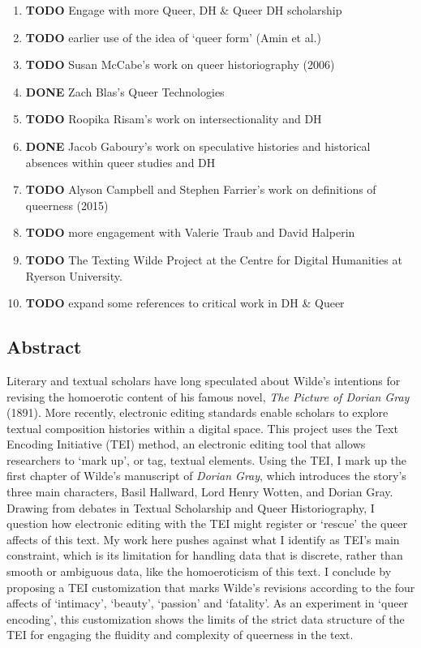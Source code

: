 \documentclass[11pt]{article}
\begin{document}
\begin{enumerate}
\item {\bfseries\sffamily TODO} Engage with more Queer, DH \& Queer DH scholarship
\label{sec:orga984432}
\item {\bfseries\sffamily TODO} earlier use of the idea of ‘queer form’ (Amin et al.)
\label{sec:org102b20c}
\item {\bfseries\sffamily TODO} Susan McCabe’s work on queer historiography (2006)
\label{sec:orgd49ad93}
\item {\bfseries\sffamily DONE} Zach Blas’s Queer Technologies
\label{sec:org9f8e8a2}
\item {\bfseries\sffamily TODO} Roopika Risam’s work on intersectionality and DH
\label{sec:org89c1e2b}
\item {\bfseries\sffamily DONE} Jacob Gaboury’s work on speculative histories and historical
\label{sec:orgbc294e5}
absences within queer studies and DH
\item {\bfseries\sffamily TODO} Alyson Campbell and Stephen Farrier’s work on definitions of
\label{sec:org1b65f54}
queerness (2015)
\item {\bfseries\sffamily TODO} more engagement with Valerie Traub and David Halperin
\label{sec:orga6c3fbe}
\item {\bfseries\sffamily TODO} The Texting Wilde Project at the Centre for Digital Humanities at Ryerson University.
\label{sec:org6d1452a}

\item {\bfseries\sffamily TODO} expand some references to critical work in DH \& Queer
\label{sec:org9b53c38}
\end{enumerate}

\subsection{Abstract}
\label{sec:org372f603}

Literary and textual scholars have long speculated about Wilde's
intentions for revising the homoerotic content of his famous novel, \emph{The
Picture of Dorian Gray} (1891). More recently, electronic editing
standards enable scholars to explore textual composition histories
within a digital space. This project uses the Text Encoding Initiative
(TEI) method, an electronic editing tool that allows researchers to
‘mark up', or tag, textual elements. Using the TEI, I mark up the first
chapter of Wilde's manuscript of \emph{Dorian Gray}, which introduces the
story's three main characters, Basil Hallward, Lord Henry Wotten, and
Dorian Gray. Drawing from debates in Textual Scholarship and Queer
Historiography, I question how electronic editing with the TEI might
register or ‘rescue' the queer affects of this text. My work here pushes
against what I identify as TEI's main constraint, which is its
limitation for handling data that is discrete, rather than smooth or
ambiguous data, like the homoeroticism of this text. I conclude by
proposing a TEI customization that marks Wilde's revisions according to
the four affects of ‘intimacy', ‘beauty', ‘passion' and ‘fatality'. As
an experiment in ‘queer encoding', this customization shows the limits
of the strict data structure of the TEI for engaging the fluidity and
complexity of queerness in the text.
\end{document}
